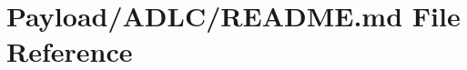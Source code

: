 \hypertarget{Payload_2ADLC_2README_8md}{\section{Payload/\-A\-D\-L\-C/\-R\-E\-A\-D\-M\-E.md File Reference}
\label{Payload_2ADLC_2README_8md}
}
